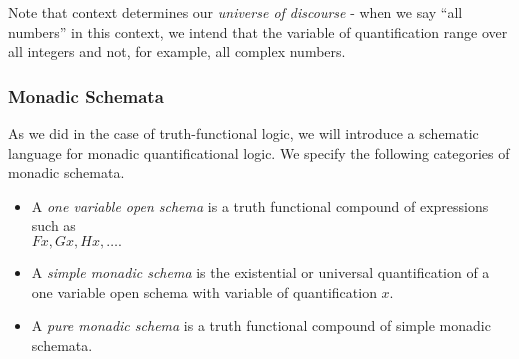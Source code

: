 Note that context determines our \emph{universe of discourse} - when we say ``all numbers'' in this context, we intend that the variable of quantification range over all integers and not, for example, all complex numbers.


\subsubsection*{Monadic Schemata}
As we did in the case of truth-functional logic, we will introduce a schematic language for monadic quantificational logic. We specify the following categories of monadic schemata.
\begin{itemize}
\item 
A \emph{ one variable open schema} is a truth functional compound of expressions
such as \\
$Fx , Gx , Hx , \ldots .$
\item
A \emph{ simple monadic schema} is the existential or universal quantification of
a one variable open schema with variable of quantification $x.$
\item
A \emph{ pure monadic schema} is a truth functional compound of simple monadic
schemata. 
\end{itemize}